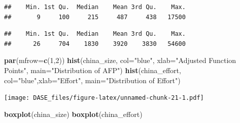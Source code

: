 \documentclass[]{book}
\newenvironment{Shaded}{\begin{snugshade}}{\end{snugshade}}
\newcommand{\KeywordTok}[1]{\textcolor[rgb]{0.13,0.29,0.53}{\textbf{{#1}}}}
\newcommand{\DataTypeTok}[1]{\textcolor[rgb]{0.13,0.29,0.53}{{#1}}}
\newcommand{\DecValTok}[1]{\textcolor[rgb]{0.00,0.00,0.81}{{#1}}}
\newcommand{\StringTok}[1]{\textcolor[rgb]{0.31,0.60,0.02}{{#1}}}
\newcommand{\NormalTok}[1]{{#1}}
\begin{document}
\begin{Shaded}
\end{Shaded}

\begin{verbatim}
##    Min. 1st Qu.  Median    Mean 3rd Qu.    Max. 
##       9     100     215     487     438   17500
\end{verbatim}

\begin{Shaded}
\end{Shaded}

\begin{verbatim}
##    Min. 1st Qu.  Median    Mean 3rd Qu.    Max. 
##      26     704    1830    3920    3830   54600
\end{verbatim}

\begin{Shaded}
\begin{Highlighting}[]
\KeywordTok{par}\NormalTok{(}\DataTypeTok{mfrow=}\KeywordTok{c}\NormalTok{(}\DecValTok{1}\NormalTok{,}\DecValTok{2}\NormalTok{))}
\KeywordTok{hist}\NormalTok{(china_size, }\DataTypeTok{col=}\StringTok{"blue"}\NormalTok{, }\DataTypeTok{xlab=}\StringTok{"Adjusted Function Points"}\NormalTok{, }\DataTypeTok{main=}\StringTok{"Distribution of AFP"}\NormalTok{)}
\KeywordTok{hist}\NormalTok{(china_effort, }\DataTypeTok{col=}\StringTok{"blue"}\NormalTok{,}\DataTypeTok{xlab=}\StringTok{"Effort"}\NormalTok{, }\DataTypeTok{main=}\StringTok{"Distribution of Effort"}\NormalTok{)}
\end{Highlighting}
\end{Shaded}

\texttt{[image: DASE\_files/figure-latex/unnamed-chunk-21-1.pdf]}

\begin{Shaded}
\begin{Highlighting}[]
\KeywordTok{boxplot}\NormalTok{(china_size)}
\KeywordTok{boxplot}\NormalTok{(china_effort)}
\end{Highlighting}
\end{Shaded}
\end{document}
